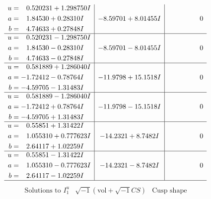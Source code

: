 \documentclass[1p]{elsarticle_modified}
\theoremstyle{definition}
\newcommand{\I}{\sqrt{-1}}
\begin{document}
$$\begin{array}{c|c|c}
\begin{aligned}
u &= \phantom{-}0.520231 + 1.298750 I \\
a &= \phantom{-}1.84530 + 0.28310 I \\
b &= \phantom{-}4.74633 + 0.27848 I\end{aligned}
 & -8.59701 + 8.01455 I & \phantom{-0.000000 } 0 \\ \hline\begin{aligned}
u &= \phantom{-}0.520231 - 1.298750 I \\
a &= \phantom{-}1.84530 - 0.28310 I \\
b &= \phantom{-}4.74633 - 0.27848 I\end{aligned}
 & -8.59701 - 8.01455 I & \phantom{-0.000000 } 0 \\ \hline\begin{aligned}
u &= \phantom{-}0.581889 + 1.286040 I \\
a &= -1.72412 - 0.78764 I \\
b &= -4.59705 - 1.31483 I\end{aligned}
 & -11.9798 + 15.1518 I & \phantom{-0.000000 } 0 \\ \hline\begin{aligned}
u &= \phantom{-}0.581889 - 1.286040 I \\
a &= -1.72412 + 0.78764 I \\
b &= -4.59705 + 1.31483 I\end{aligned}
 & -11.9798 - 15.1518 I & \phantom{-0.000000 } 0 \\ \hline\begin{aligned}
u &= \phantom{-}0.55851 + 1.31422 I \\
a &= \phantom{-}1.055310 + 0.777623 I \\
b &= \phantom{-}2.64117 + 1.02259 I\end{aligned}
 & -14.2321 + 8.7482 I & \phantom{-0.000000 } 0 \\ \hline\begin{aligned}
u &= \phantom{-}0.55851 - 1.31422 I \\
a &= \phantom{-}1.055310 - 0.777623 I \\
b &= \phantom{-}2.64117 - 1.02259 I\end{aligned}
 & -14.2321 - 8.7482 I & \phantom{-0.000000 } 0\\
 \hline 
 \end{array}$$\newpage$$\begin{array}{c|c|c}  
\text{Solutions to }I^u_{1}& \I (\text{vol} + \sqrt{-1}CS) & \text{Cusp shape}\\
 \hline 
\begin{aligned}

\end{aligned}
\end{array}$$
\end{document}
